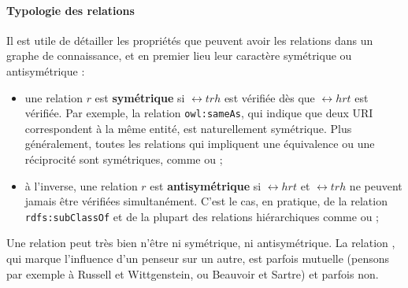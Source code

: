 \paragraph{Typologie des relations} 

Il est utile de détailler les propriétés que peuvent avoir les relations dans un graphe de connaissance, et en premier lieu leur caractère symétrique ou antisymétrique :
\begin{itemize}
    \item une relation $r$ est \textbf{symétrique} si $\rel{t}{r}{h}$ est vérifiée dès que $\rel{h}{r}{t}$ est vérifiée. Par exemple, la relation \texttt{owl:sameAs}, qui indique que deux URI correspondent à la même entité, est naturellement symétrique. Plus généralement, toutes les relations qui impliquent une équivalence ou une réciprocité sont symétriques, comme  ou ;
    \item à l'inverse, une relation $r$ est \textbf{antisymétrique} si $\rel{h}{r}{t}$ et $\rel{t}{r}{h}$ ne peuvent jamais être vérifiées simultanément. C'est le cas, en pratique, de la relation \texttt{rdfs:subClassOf} et de la plupart des relations hiérarchiques comme  ou ;
\end{itemize}
Une relation peut très bien n'être ni symétrique, ni antisymétrique. La relation , qui marque l'influence d'un penseur sur un autre, est parfois mutuelle (pensons par exemple à Russell et Wittgenstein, ou Beauvoir et Sartre) et parfois non.

